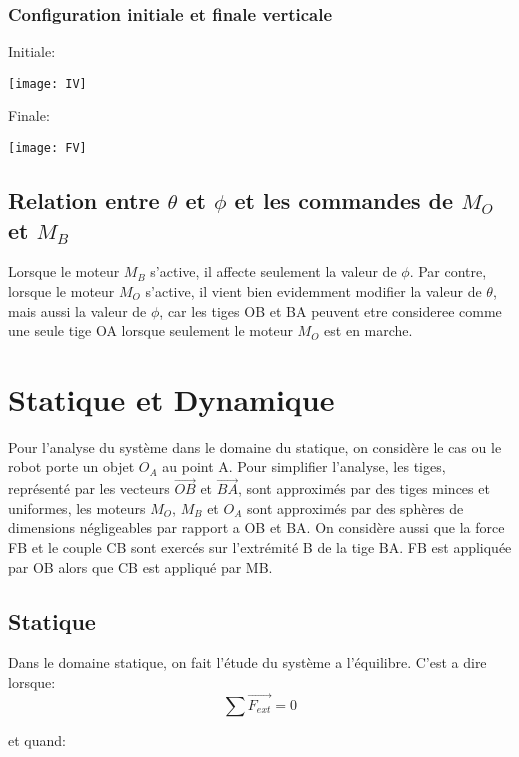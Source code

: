 \documentclass{article}
\begin{document}
\subsubsection{Configuration initiale et finale verticale}
Initiale:
\newline
\centerline{\noindent \texttt{[image: IV]}}
\newline
\newline
\noindent Finale:
\newline
\centerline{\noindent \texttt{[image: FV]}}
\newline

\subsection{Relation entre $\theta$ et $\phi$ et les commandes de $M_O$ et $M_B$}
Lorsque le moteur $M_B$ s'active, il affecte seulement la valeur de $\phi$. Par contre, lorsque le moteur $M_O$ s'active, il vient bien evidemment modifier la valeur de $\theta$, mais aussi la valeur de $\phi$, car les tiges OB et BA peuvent etre consideree comme une seule tige OA lorsque seulement le moteur $M_O$ est en marche.

\section{Statique et Dynamique}
Pour l'analyse du système dans le domaine du statique, on considère le cas ou le robot porte un objet $O_A$ au point A. Pour simplifier l'analyse, les tiges, représenté par les vecteurs $\overrightarrow{OB}$ et $\overrightarrow{BA}$, sont approximés par des tiges minces et uniformes, les moteurs $M_O$, $M_B$ et $O_A$ sont approximés par des sphères de dimensions négligeables par rapport a OB et BA. On considère aussi que la force FB et le couple CB sont exercés sur l’extrémité B de la tige BA. FB est appliquée par OB alors que CB est appliqué par MB.

\subsection{Statique}
Dans le domaine statique, on fait l'étude du système a l'équilibre. C'est a dire lorsque: 
\begin{equation}
\sum \overrightarrow{F_{ext}} = 0
\end{equation}

\begin{center} 
et quand:
\end{center}
\end{document}
